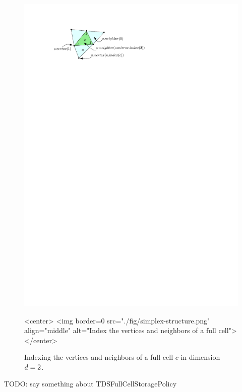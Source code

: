 \begin{figure}[htbp]
\begin{ccTexOnly}
\begin{center}
\includegraphics{Triangulation/fig/simplex-structure.pdf}
\end{center}
\end{ccTexOnly}
\begin{ccHtmlOnly}
<center>
<img border=0 src="./fig/simplex-structure.png" align="middle"
alt="Index the vertices and neighbors of a full cell">
</center>
\end{ccHtmlOnly}
\caption{Indexing the vertices and neighbors of a full cell $c$ in
  dimension $d=2$.}
\label{triangulation:fig:full-cell}
\end{figure} 

\begin{ccAdvanced}
  TODO: say something about TDSFullCellStoragePolicy
\end{ccAdvanced}

